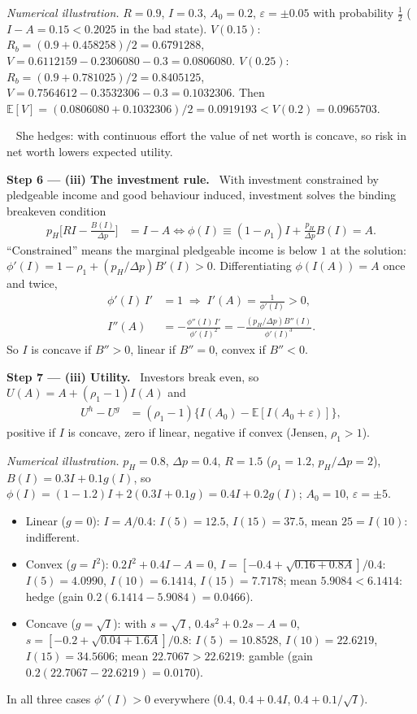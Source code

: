 \documentclass[11pt,a4paper]{article}
\newcommand{\step}[2]{\par\medskip\noindent\textbf{Step #1 --- #2.}~}
\newcommand{\answer}[1]{\par\smallskip\noindent\fbox{\textbf{Answer #1.}}~}
\begin{document}
\emph{Numerical illustration.} $R=0.9$, $I=0.3$, $A_0=0.2$, $\varepsilon=\pm0.05$ with
probability $\tfrac12$ ($I-A=0.15<0.2025$ in the bad state). $V(0.15)$: $R_b=(0.9+0.458258)/2=0.6791288$,
$V=0.6112159-0.2306080-0.3=0.0806080$. $V(0.25)$: $R_b=(0.9+0.781025)/2=0.8405125$,
$V=0.7564612-0.3532306-0.3=0.1032306$. Then $\mathbb{E}[V]=(0.0806080+0.1032306)/2=0.0919193<V(0.2)=0.0965703$.

\answer{(ii)} She hedges: with continuous effort the value of net worth is concave, so risk
in net worth lowers expected utility.

\step{6}{(iii) The investment rule} With investment constrained by pledgeable income and good
behaviour induced, investment solves the binding breakeven condition
\begin{align}
  p_H\Big[RI-\frac{B(I)}{\Delta p}\Big] &= I-A
  \iff \phi(I)\equiv(1-\rho_1)I+\frac{p_H}{\Delta p}B(I)=A. \label{r4e15-phi}
\end{align}
``Constrained'' means the marginal pledgeable income is below $1$ at the solution:
$\phi'(I)=1-\rho_1+(p_H/\Delta p)B'(I)>0$. Differentiating $\phi(I(A))=A$ once and twice,
\begin{align}
  \phi'(I)\,I' &= 1 \;\Rightarrow\; I'(A)=\frac{1}{\phi'(I)}>0, \nonumber\\
  I''(A) &= -\frac{\phi''(I)\,I'}{\phi'(I)^2} = -\frac{(p_H/\Delta p)B''(I)}{\phi'(I)^3}. \nonumber
\end{align}
So $I$ is concave if $B''>0$, linear if $B''=0$, convex if $B''<0$.

\step{7}{(iii) Utility} Investors break even, so $U(A)=A+(\rho_1-1)I(A)$ and
\begin{align}
  U^h-U^g &= (\rho_1-1)\big\{I(A_0)-\mathbb{E}[I(A_0+\varepsilon)]\big\}, \nonumber
\end{align}
positive if $I$ is concave, zero if linear, negative if convex (Jensen, $\rho_1>1$).

\emph{Numerical illustration.} $p_H=0.8$, $\Delta p=0.4$, $R=1.5$ ($\rho_1=1.2$, $p_H/\Delta p=2$),
$B(I)=0.3I+0.1g(I)$, so $\phi(I)=(1-1.2)I+2(0.3I+0.1g)=0.4I+0.2g(I)$; $A_0=10$, $\varepsilon=\pm5$.
\begin{itemize}
  \item Linear ($g=0$): $I=A/0.4$: $I(5)=12.5$, $I(15)=37.5$, mean $25=I(10)$: indifferent.
  \item Convex ($g=I^2$): $0.2I^2+0.4I-A=0$, $I=[-0.4+\sqrt{0.16+0.8A}]/0.4$: $I(5)=4.0990$,
        $I(10)=6.1414$, $I(15)=7.7178$; mean $5.9084<6.1414$: hedge (gain $0.2(6.1414-5.9084)=0.0466$).
  \item Concave ($g=\sqrt I$): with $s=\sqrt I$, $0.4s^2+0.2s-A=0$, $s=[-0.2+\sqrt{0.04+1.6A}]/0.8$:
        $I(5)=10.8528$, $I(10)=22.6219$, $I(15)=34.5606$; mean $22.7067>22.6219$: gamble
        (gain $0.2(22.7067-22.6219)=0.0170$).
\end{itemize}
In all three cases $\phi'(I)>0$ everywhere ($0.4$, $0.4+0.4I$, $0.4+0.1/\sqrt I$).
\end{document}
